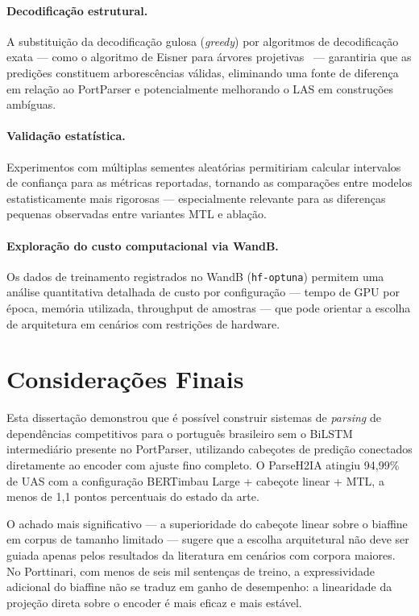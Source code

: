 \paragraph{Decodificação estrutural.} A substituição da decodificação gulosa (\textit{greedy})
por algoritmos de decodificação exata — como o algoritmo de Eisner para árvores
projetivas~\citep{eisner1996} — garantiria que as predições constituem arborescências válidas,
eliminando uma fonte de diferença em relação ao PortParser e potencialmente melhorando o LAS
em construções ambíguas.

\paragraph{Validação estatística.} Experimentos com múltiplas sementes aleatórias permitiriam
calcular intervalos de confiança para as métricas reportadas, tornando as comparações entre
modelos estatisticamente mais rigorosas — especialmente relevante para as diferenças pequenas
observadas entre variantes MTL e ablação.

\paragraph{Exploração do custo computacional via WandB.} Os dados de treinamento registrados
no WandB (\texttt{hf-optuna}) permitem uma análise quantitativa detalhada de custo por
configuração — tempo de GPU por época, memória utilizada, throughput de amostras — que pode
orientar a escolha de arquitetura em cenários com restrições de hardware.

\section{Considerações Finais}
\label{sec:consideracoes_finais}

Esta dissertação demonstrou que é possível construir sistemas de \textit{parsing} de
dependências competitivos para o português brasileiro sem o BiLSTM intermediário presente no
PortParser, utilizando cabeçotes de predição conectados diretamente ao encoder com ajuste fino
completo. O ParseH2IA atingiu 94,99\% de UAS com a configuração BERTimbau Large + cabeçote
linear + MTL, a menos de 1,1 pontos percentuais do estado da arte.

O achado mais significativo — a superioridade do cabeçote linear sobre o biaffine em corpus
de tamanho limitado — sugere que a escolha arquitetural não deve ser guiada apenas pelos
resultados da literatura em cenários com corpora maiores. No Porttinari, com menos de seis mil
sentenças de treino, a expressividade adicional do biaffine não se traduz em ganho de
desempenho: a linearidade da projeção direta sobre o encoder é mais eficaz e mais estável.

